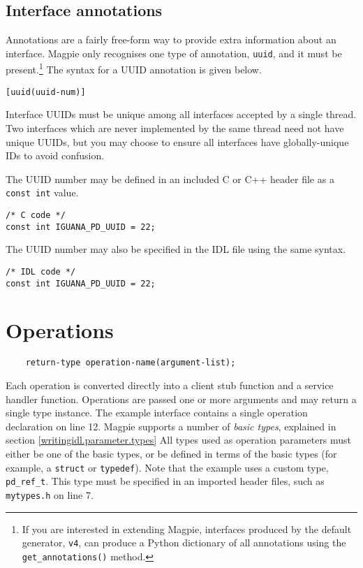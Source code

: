 \subsection{Interface annotations}
Annotations are a fairly free-form way to provide extra information about an interface. Magpie only recognises one type of annotation, {\tt uuid}, and it must be present.\footnote{If you are interested in extending Magpie, interfaces produced by the default generator, {\tt v4}, can produce a Python dictionary of all annotations using the {\tt get\_annotations()} method.} The syntax for a UUID annotation is given below.
\begin{verbatim}
[uuid(uuid-num)]
\end{verbatim}

Interface UUIDs must be unique among all interfaces accepted by a single thread. Two interfaces which are never implemented by the same thread need not have unique UUIDs, but you may choose to ensure all interfaces have globally-unique IDs to avoid confusion.

The UUID number may be defined in an included C or C++ header file as a {\tt const int} value.
\begin{verbatim}
/* C code */
const int IGUANA_PD_UUID = 22;
\end{verbatim}
The UUID number may also be specified in the IDL file using the same syntax.
\begin{verbatim}
/* IDL code */
const int IGUANA_PD_UUID = 22;
\end{verbatim}

\section{Operations}
\begin{verbatim}
    return-type operation-name(argument-list);
\end{verbatim}

Each operation is converted directly into a client stub function and a service handler function. Operations are passed one or more arguments and may return a single type instance. The example interface contains a single operation declaration on line 12. Magpie supports a number of {\it basic types}, explained in section \ref{writingidl.parameter.types} All types used as operation parameters must either be one of the basic types, or be defined in terms of the basic types (for example, a {\tt struct} or {\tt typedef}). Note that the example uses a custom type, {\tt pd\_ref\_t}. This type must be specified in an imported header files, such as {\tt mytypes.h} on line 7.

